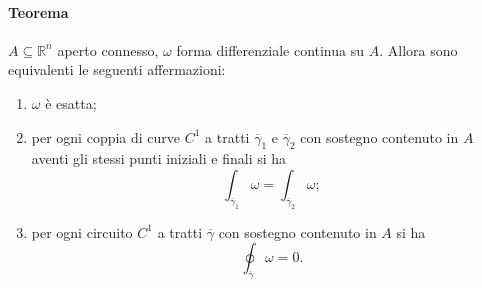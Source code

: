 \documentclass{article}
\newcommand{\R}{\mathbb{R}}
\begin{document}
\paragraph{Teorema}
$A \subseteq \R^n$ aperto connesso, $\omega$ forma differenziale continua su $A$. Allora sono equivalenti le seguenti affermazioni:
\begin{enumerate}
    \item $\omega$ è esatta;
    \item per ogni coppia di curve $C^1$ a tratti $\overline{\gamma}_1$ e $\overline{\gamma}_2$ con sostegno contenuto in $A$ aventi gli stessi punti iniziali e finali si ha
    \begin{equation*}
        \int_{\overline{\gamma}_1}\omega=\int_{\overline{\gamma}_2}\omega;
    \end{equation*}
    \item per ogni circuito $C^1$ a tratti $\overline{\gamma}$ con sostegno contenuto in $A$ si ha
    \begin{equation*}
        \oint_{\overline{\gamma}}\omega=0.
    \end{equation*}
\end{enumerate}
\end{document}
